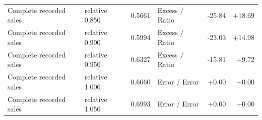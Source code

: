 \begin{table}[t]
\begin{tabular}{llrlrr}
Complete recorded sales & relative 0.850 & 0.5661 & Excess / Ratio & -25.84 & +18.69 \\
Complete recorded sales & relative 0.900 & 0.5994 & Excess / Ratio & -23.03 & +14.98 \\
Complete recorded sales & relative 0.950 & 0.6327 & Excess / Ratio & -15.81 & +9.72 \\
Complete recorded sales & relative 1.000 & 0.6660 & Error / Error & +0.00 & +0.00 \\
Complete recorded sales & relative 1.050 & 0.6993 & Error / Error & +0.00 & +0.00 \\\bottomrule\end{tabular}\end{table}

